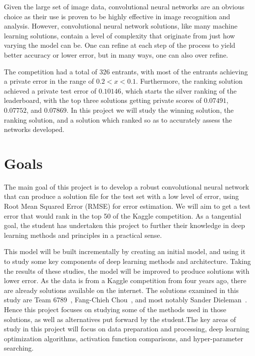\documentclass[12pt,a4paper,oneside,oldfontcommands]{memoir}
\begin{document}
\begin{Declaration Of OriginalityOrginality}
Given the large set of image data, convolutional neural networks are an obvious choice as their use is proven to be highly effective in image recognition and analysis. However, convolutional neural network solutions, like many machine learning solutions, contain a level of complexity that originate from just how varying the model can be. One can refine at each step of the process to yield better accuracy or lower error, but in many ways, one can also over refine.

The competition had a total of \(326\) entrants, with most of the entrants achieving a private error in the range of \(0.2 < x < 0.1\). Furthermore, the  ranking solution achieved a private test error of \(0.10146\), which starts the silver ranking of the leaderboard, with the top three solutions getting private scores of \(0.07491\), \(0.07752\), and \(0.07869\). In this project we will study the winning solution, the  ranking solution, and a solution which ranked  so as to accurately assess the networks developed. 

\section{Goals} \label{goals}

The main goal of this project is to develop a robust convolutional neural network that can produce a solution file for the test set with a low level of error, using Root Mean Squared Error (RMSE) for error estimation. We will aim to get a test error that would rank in the top 50 of the Kaggle competition. As a tangential goal, the student has undertaken this project to further their knowledge in deep learning methods and principles in a practical sense.


This model will be built incrementally by creating an initial model, and using it to study some key components of deep learning methods and architecture. Taking the results of these studies, the model will be improved to produce solutions with lower error. As the data is from a Kaggle competition from four years ago, there are already solutions available on the internet. The solutions examined in this study are Team 6789~\cite{Nguyen}, Fang-Chieh Chou~\cite{Fang}, and most notably Sander Dieleman~\cite{Sanders-GZ}. Hence this project focuses on studying some of the methods used in those solutions, as well as alternatives put forward by the student.The key areas of study in this project will focus on data preparation and processing, deep learning optimization algorithms, activation function comparisons, and hyper-parameter searching.


\end{Declaration Of OriginalityOrginality}
\end{document}
